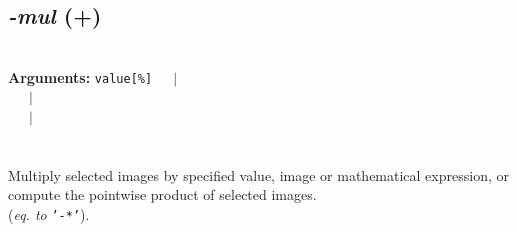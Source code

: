 \documentclass[a4paper,11pt,twoside]{book}
\begin{document}
\subsection{\emph{-mul} (+)}\vspace*{-0.5em}
~\\\textbf{Arguments: } 
{\small \texttt{value[\%]}}~~~$|$\\
\hspace*{2.2cm}{\small \texttt{[image]}}~~~$|$\\
~~~$|$\\
\\~\\
Multiply selected images by specified value, image or mathematical expression,
or compute the pointwise product of selected images.
~\\(\emph{eq. to} {\small \texttt{'-*'}}).
\end{document}
